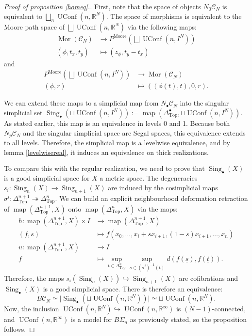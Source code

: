 \documentclass[12pt]{amsart}
\theoremstyle{plain}
\theoremstyle{definition}
\theoremstyle{remark}
\DeclareMathOperator{\map}{map}
\DeclareMathOperator{\UConf}{UConf}
\DeclareMathOperator{\Mor}{Mor}
\DeclareMathOperator{\Top}{Top}
\DeclareMathOperator{\Moore}{Moore}
\DeclareMathOperator{\Sing}{Sing}
\newcommand{\C}{\mathcal{C}}
\begin{document}
\begin{proof}[Proof of proposition \ref{homeq}.]
First, note that the space of objects $N_0\C_N$ is equivalent to $\bigsqcup_n \UConf(n,\mathbb{R}^N)$. 
The space of morphisms is equivalent to the Moore path space of $\bigsqcup \UConf(n,\mathbb{R}^N)$ via the following maps:
\begin{align*}
\Mor(\C_N) &\rightarrow P^{\Moore}\left(\bigsqcup \UConf(n,I^N)\right)\\
(\phi,t_x,t_y) &\mapsto (z_\phi, t_y-t_x)
\end{align*}
and
\begin{align*}
    P^{\Moore}\left(\bigsqcup \UConf(n,I^N)\right) &\rightarrow \Mor(\C_N)\\
    (\phi,r) &\mapsto ((\phi(t),t),0,r).
\end{align*}

We can extend these maps to a simplicial map from $N_\bullet \C_N$ into the singular simplicial set $\Sing_\bullet( \sqcup \UConf(n,I^N)) := \map(\Delta^\bullet_{\Top}, \displaystyle \sqcup \UConf(n,I^N))$.
As stated earlier, this map is an equivalence in levels 0 and 1. Because both $N_p\C_N$ and the singular simplicial space are Segal spaces, this equivalence extends to all levels.
Therefore, the simplicial map is a levelwise equivalence, and by lemma \ref{levelwisereal}, it induces an equivalence on thick realizations.

To compare this with the regular realization, we need to prove that $\Sing_\bullet(X)$ is a good simplicial space for $X$ a metric space.
The degeneracies $s_i:\Sing_n(X)\rightarrow \Sing_{n+1}(X)$ are induced by the cosimplicial maps $\sigma^i:\Delta^{n+1}_{\Top}\twoheadrightarrow \Delta^n_{\Top}$.
We can build an explicit neighbourhood deformation retraction of $\map(\Delta^{n+1}_{\Top},X)$ onto $\map(\Delta^{n}_{\Top},X)$ via the maps:
\begin{align*}
h: \map(\Delta^{n+1}_{\Top},X)\times I&\rightarrow \map(\Delta^{n+1}_{\Top},X)\\
(f,s)&\mapsto f(x_0,\dots, x_i+sx_{i+1}, (1-s)x_{i+1}, \dots, x_{n})\\
u:\map(\Delta^{n+1}_{\Top},X)&\rightarrow I\\
f&\mapsto \sup_{\underline{t}\in\Delta^n_{\Top}}\sup_{\underline{s}\in(\sigma^i)^{-1}(t)} d(f(\underline{s}),f(\underline{t})).
\end{align*}
Therefore, the maps $s_i(\Sing_n(X))\hookrightarrow \Sing_{n+1}(X)$ are cofibrations and $\Sing_\bullet(X)$ is a good simplicial space.
There is therefore an equivalence: \[B\C_N\simeq \vert \Sing_\bullet(\sqcup \UConf(n,\mathbb{R}^N))\vert \simeq \sqcup \UConf(n,\mathbb{R}^N).\]
Now, the inclusion $\UConf(n,\mathbb{R}^N)\hookrightarrow \UConf(n,\mathbb{R}^\infty)$ is $(N-1)$-connected, and $\UConf(n,\mathbb{R}^\infty)$ is a model for $B\Sigma_n$ as previously stated, so the proposition follows.
\end{proof}
\end{document}
